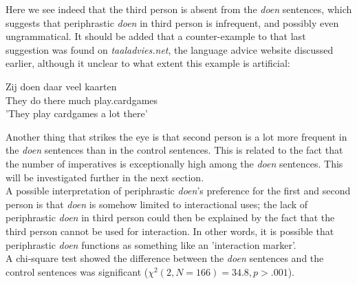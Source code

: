 \documentclass[12pt]{article}
\begin{document}
\begin{table}[h] \footnotesize

\caption{\footnotesize Distribution person for the \emph{doen} sentences and the control sentences.}
\end{table}

Here we see indeed that the third person is absent from the \emph{doen} sentences, which suggests that periphrastic \emph{doen} in third person is infrequent, and possibly even ungrammatical. It should be added that a counter-example to that last suggestion was found on \emph{taaladvies.net}, the language advice website discussed earlier, although it unclear to what extent this example is artificial:

\begin{exe}
\ex \gll Zij doen daar veel kaarten\\
They do there much play.cardgames\\
'They play cardgames a lot there'
\end{exe}

Another thing that strikes the eye is that second person is a lot more frequent in the \emph{doen} sentences than in the control sentences. This is related to the fact that the number of imperatives is exceptionally high among the \emph{doen} sentences. This will be investigated further in the next section.\\\indent
A possible interpretation of periphrastic \emph{doen}'s preference for the first and second person is that \emph{doen} is somehow limited to interactional uses; the lack of periphrastic \emph{doen} in third person could then be explained by the fact that the third person cannot be used for interaction. In other words, it is possible that periphrastic \emph{doen} functions as something like an 'interaction marker'.\\\indent
A chi-square test showed the difference between the \emph{doen} sentences and the control sentences was significant ($\chi^2(2, N=166) = 34.8, p > .001$).
\end{document}
